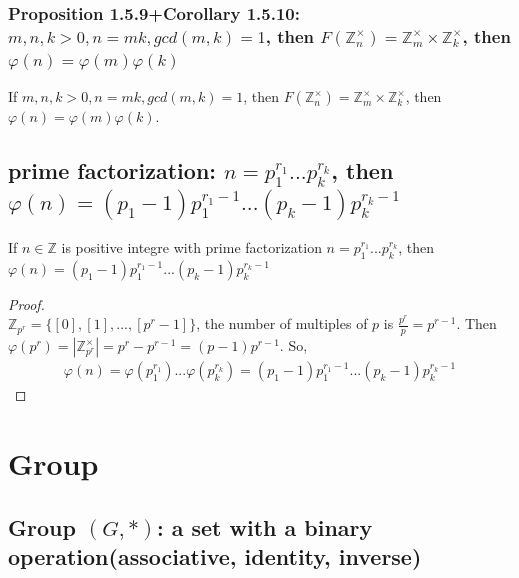 \documentclass[11pt]{elegantbook}
\begin{document}
\subsection{Proposition 1.5.9+Corollary 1.5.10: $m,n,k>0,n=mk,gcd(m,k)=1$, then $F(\mathbb{Z}_n^{\times})=\mathbb{Z}_m^{\times}\times\mathbb{Z}_k^{\times}$, then $\varphi(n)=\varphi(m)\varphi(k)$}
\begin{proposition}
    If $m,n,k>0,n=mk,gcd(m,k)=1$, then $F(\mathbb{Z}_n^{\times})=\mathbb{Z}_m^{\times}\times\mathbb{Z}_k^{\times}$, then $\varphi(n)=\varphi(m)\varphi(k)$.
\end{proposition}

\section{prime factorization: $n=p_1^{r_1}...p_k^{r_k}$, then $\varphi(n)=(p_1-1)p_1^{r_1-1}...(p_k-1)p_k^{r_k-1}$}
\begin{proposition}
If $n\in\mathbb{Z}$ is positive integre with prime factorization $n=p_1^{r_1}...p_k^{r_k}$, then $\varphi(n)=(p_1-1)p_1^{r_1-1}...(p_k-1)p_k^{r_k-1}$
\end{proposition}
\begin{proof}
\quad\\
$\mathbb{Z}_{p^r}=\{[0],[1],...,[p^r-1]\}$, the number of multiples of $p$ is $\frac{p^r}{p}=p^{r-1}$. Then $\varphi(p^r)=|\mathbb{Z}_{p^r}^{\times}|=p^r-p^{r-1}=(p-1)p^{r-1}$. So,
\begin{equation}
    \begin{aligned}
        \varphi(n)=\varphi(p_1^{r_1})...\varphi(p_k^{r_k})=(p_1-1)p_1^{r_1-1}...(p_k-1)p_k^{r_k-1}
    \end{aligned}
    \nonumber
\end{equation}
\end{proof}







\chapter{Group}
\section{Group $(G, *)$: a set with a binary operation(associative, identity, inverse)}
\end{document}
